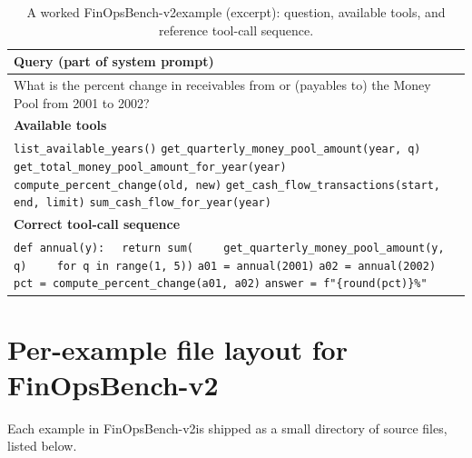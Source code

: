 \documentclass[11pt]{article}
\newcommand{\groundedfinqa}{FinOpsBench-v2}\xspace
\begin{document}
\begin{table}[t]
\centering
\scriptsize
\setlength{\tabcolsep}{3pt}
\renewcommand{\arraystretch}{1.1}
\begin{tabularx}{\columnwidth}{@{}X@{}}
\toprule
\textbf{Query (part of system prompt)} \\
\midrule
What is the percent change in receivables from or (payables to) the Money Pool from 2001 to 2002? \\
\midrule
\textbf{Available tools} \\
\midrule
\texttt{list\_available\_years()} \newline
\texttt{get\_quarterly\_money\_pool\_amount(year, q)} \newline
\texttt{get\_total\_money\_pool\_amount\_for\_year(year)} \newline
\texttt{compute\_percent\_change(old, new)} \newline
\texttt{get\_cash\_flow\_transactions(start, end, limit)} \newline
\texttt{sum\_cash\_flow\_for\_year(year)} \\
\midrule
\textbf{Correct tool-call sequence} \\
\midrule
\texttt{def annual(y):} \newline
\texttt{\ \ return sum(} \newline
\texttt{\ \ \ \ get\_quarterly\_money\_pool\_amount(y, q)} \newline
\texttt{\ \ \ \ for q in range(1, 5))} \newline
\texttt{a01 = annual(2001)} \newline
\texttt{a02 = annual(2002)} \newline
\texttt{pct = compute\_percent\_change(a01, a02)} \newline
\texttt{answer = f"\{round(pct)\}\%"} \\
\bottomrule
\end{tabularx}
\caption{A worked \groundedfinqa example (excerpt): question, available tools, and reference tool-call sequence.}
\label{tab:example}
\end{table}

\section{Per-example file layout for \groundedfinqa}
\label{app:v2_file_layout}

Each example in \groundedfinqa is shipped as a small directory of source files, listed below.
\end{document}
